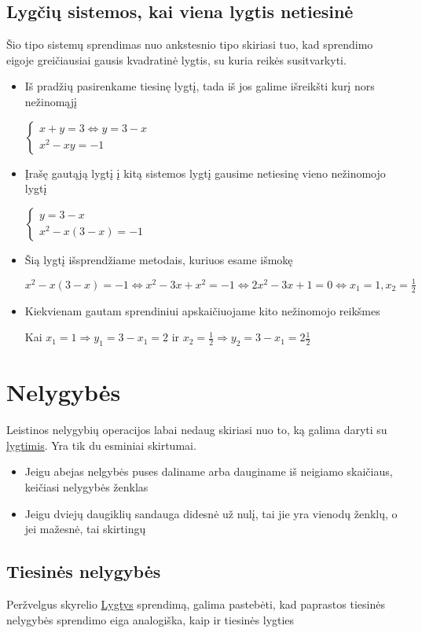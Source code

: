 \documentclass[12pt,a4paper]{report}
\numberwithin{table}{chapter}
\numberwithin{figure}{chapter}
\theoremstyle{definition}
\begin{document}
\section{Lygčių sistemos, kai viena lygtis netiesinė}
Šio tipo sistemų sprendimas nuo ankstesnio tipo skiriasi tuo, kad sprendimo eigoje greičiausiai gausis kvadratinė lygtis, su kuria reikės susitvarkyti.
\begin{itemize}
\item Iš pradžių pasirenkame tiesinę lygtį, tada iš jos galime išreikšti kurį nors nežinomąjį

$\begin{cases} x+y=3 \Leftrightarrow y=3-x \\ x^2-xy=-1 \end{cases}$
\item Įrašę gautąją lygtį į kitą sistemos lygtį gausime netiesinę vieno nežinomojo lygtį

$\begin{cases} y=3-x \\ x^2-x(3-x)=-1 \end{cases}$
\item Šią lygtį išsprendžiame metodais, kuriuos esame išmokę

$x^2-x(3-x)=-1 \Leftrightarrow x^2-3x+x^2=-1 \Leftrightarrow 2x^2-3x+1=0 \Leftrightarrow x_1=1, x_2=\frac{1}{2}$
\item Kiekvienam gautam sprendiniui apskaičiuojame kito nežinomojo reikšmes

Kai $x_1=1 \Rightarrow y_1=3-x_1=2$ ir $x_2=\frac{1}{2} \Rightarrow y_2=3-x_1=2\frac{1}{2}$
\end{itemize}

\chapter{Nelygybės}
Leistinos nelygybių operacijos labai nedaug skiriasi nuo to, ką galima daryti su \hyperref[sec: lygtys]{lygtimis}. Yra tik du esminiai skirtumai.
\begin{itemize}
\item Jeigu abejas nelgybės puses daliname arba dauginame iš neigiamo skaičiaus, keičiasi nelygybės ženklas
\item Jeigu dviejų daugiklių sandauga didesnė už nulį, tai jie yra vienodų ženklų, o jei mažesnė, tai skirtingų
\end{itemize}
\section{Tiesinės nelygybės}
Peržvelgus skyrelio \hyperref[sec: lygtys]{Lygtys} sprendimą, galima pastebėti, kad paprastos tiesinės nelygybės sprendimo eiga analogiška, kaip ir tiesinės lygties
\end{document}
